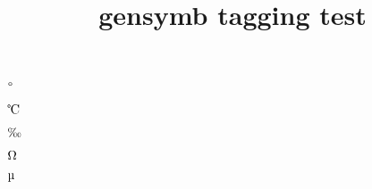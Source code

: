 \documentclass{article}
\title{gensymb tagging test}
\begin{document}
\degree $\degree$

\celsius $\celsius$

\perthousand $\perthousand$

\ohm $\ohm$

\micro $\micro$
\end{document}
